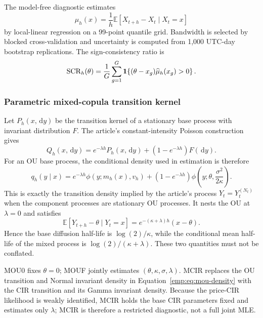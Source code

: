 \documentclass[11pt]{article}
\newcommand{\E}{\mathbb{E}}
\newcommand{\1}{\mathbf{1}}
\newcommand{\dd}{\,\mathrm{d}}
\begin{document}
The model-free diagnostic estimates
\begin{equation}
\mu_h(x)=\frac{1}{h}\E[X_{t+h}-X_t\mid X_t=x]
\label{emp:eq:finite-drift}
\end{equation}
by local-linear regression on a 99-point quantile grid.  Bandwidth is selected by
blocked cross-validation and uncertainty is computed from 1,000 UTC-day bootstrap
replications.  The sign-consistency ratio is
\begin{equation}
\operatorname{SCR}_h(\theta)
=\frac{1}{G}\sum_{g=1}^G
\mathbf 1\!\left\{(\theta-x_g)\widehat\mu_h(x_g)>0\right\}.
\label{emp:eq:scr}
\end{equation}

\subsubsection{Parametric mixed-copula transition kernel}

Let $P_h(x,\dd y)$ be the transition kernel of a stationary base process with
invariant distribution $F$.  The article's constant-intensity Poisson
construction gives
\begin{equation}
Q_h(x,\dd y)
=e^{-\lambda h}P_h(x,\dd y)
+\left(1-e^{-\lambda h}\right)F(\dd y).
\label{emp:eq:mixed-kernel}
\end{equation}
For an OU base process, the conditional density used in estimation is therefore
\begin{equation}
q_h(y\mid x)
=e^{-\lambda h}\phi\!\left(y;m_h(x),v_h\right)
+\left(1-e^{-\lambda h}\right)
\phi\!\left(y;\theta,\frac{\sigma^2}{2\kappa}\right).
\label{emp:eq:mou-density}
\end{equation}
This is exactly the transition density implied by the article's process
$Y_t=Y_t^{(N_t)}$ when the component processes are stationary OU processes.
It nests the OU at $\lambda=0$ and satisfies
\begin{equation}
\E[Y_{t+h}-\theta\mid Y_t=x]
=e^{-(\kappa+\lambda)h}(x-\theta).
\label{emp:eq:mou-mean}
\end{equation}
Hence the base diffusion half-life is $\log(2)/\kappa$, while the conditional
mean half-life of the mixed process is $\log(2)/(\kappa+\lambda)$.  These two
quantities must not be conflated.

MOU0 fixes $\theta=0$; MOUF jointly estimates
$(\theta,\kappa,\sigma,\lambda)$.  MCIR replaces the OU transition and Normal
invariant density in Equation~\eqref{emp:eq:mou-density} with the CIR transition
and its Gamma invariant density.  Because the price-CIR likelihood is weakly
identified, MCIR holds the base CIR parameters fixed and estimates only
$\lambda$; MCIR is therefore a restricted diagnostic, not a full joint MLE.
\end{document}
